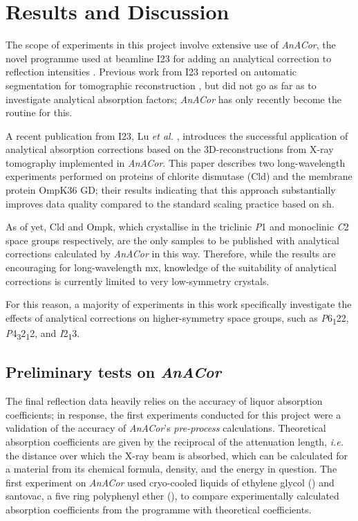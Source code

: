 \newpage
\section{Results and Discussion}

The scope of experiments in this project involve extensive use of \textit{AnACor}, the novel programme used at beamline I23 for adding an analytical correction to reflection intensities \cite{Lu2024}. Previous work from I23 reported on automatic segmentation for tomographic reconstruction \cite{Kazantsev2021}, but did not go as far as to investigate analytical absorption factors; \textit{AnACor} has only recently become the routine for this.

A recent publication from I23, Lu \textit{et al.} \cite{Lu2024}, introduces the successful application of analytical absorption corrections based on the 3D-reconstructions from X-ray tomography implemented in \textit{AnACor}. This paper describes two long-wavelength experiments performed on proteins of chlorite dismutase (Cld) and the membrane protein OmpK36 GD; their results indicating that this approach substantially improves data quality compared to the standard scaling practice based on \ac{sh}.

As of yet, Cld and Ompk, which crystallise in the triclinic \textit{P}1 and monoclinic \textit{C}2 space groups respectively, are the only samples to be published with analytical corrections calculated by \textit{AnACor} in this way. Therefore, while the results are encouraging for long-wavelength \ac{mx}, knowledge of the suitability of analytical corrections is currently limited to very low-symmetry crystals.

For this reason, a majority of experiments in this work specifically investigate the effects of analytical corrections on higher-symmetry space groups, such as \textit{P}6\textsubscript{1}22, \textit{P}4\textsubscript{3}2\textsubscript{1}2, and \textit{I}2\textsubscript{1}3.





\subsection{Preliminary tests on \textit{AnACor}}

The final reflection data heavily relies on the accuracy of liquor absorption coefficients; in response, the first experiments conducted for this project were a validation of the accuracy of \textit{AnACor}'s \textit{pre-process} calculations. Theoretical absorption coefficients are given by the reciprocal of the attenuation length, \textit{i.e.}  the distance over which the X-ray beam is absorbed, which can be calculated for a material from its chemical formula, density, and the energy in question. The first experiment on \textit{AnACor} used cryo-cooled liquids of ethylene glycol () and santovac, a five ring polyphenyl ether (), to compare experimentally calculated absorption coefficients from the programme with theoretical coefficients.

